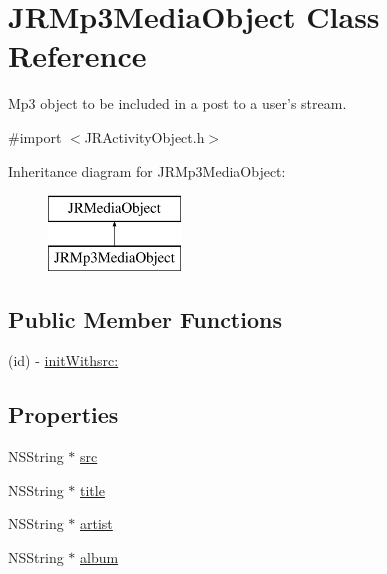 \hypertarget{interface_j_r_mp3_media_object}{
\section{JRMp3MediaObject Class Reference}
\label{interface_j_r_mp3_media_object}
}


Mp3 object to be included in a post to a user's stream.  




{\ttfamily \#import $<$JRActivityObject.h$>$}

Inheritance diagram for JRMp3MediaObject:\begin{figure}[H]
\begin{center}
\leavevmode
\includegraphics[height=2.000000cm]{interface_j_r_mp3_media_object}
\end{center}
\end{figure}
\subsection*{Public Member Functions}
\begin{DoxyCompactItemize}
\item 
(id) -\/ \hyperlink{interface_j_r_mp3_media_object_acd2154d8f3a288a9fe45dd11642ac733}{initWithsrc:}
\end{DoxyCompactItemize}
\subsection*{Properties}
\begin{DoxyCompactItemize}
\item 
NSString $\ast$ \hyperlink{interface_j_r_mp3_media_object_ae6ae676c1841834aba74a2c5d11cb54c}{src}
\item 
NSString $\ast$ \hyperlink{interface_j_r_mp3_media_object_accd252e22f704fd4b314217317f0b5cb}{title}
\item 
NSString $\ast$ \hyperlink{interface_j_r_mp3_media_object_aa164b3ecc14b03d36f5093d3d4d7f5b1}{artist}
\item 
NSString $\ast$ \hyperlink{interface_j_r_mp3_media_object_adefc6578183aa09a492b229696f581df}{album}
\end{DoxyCompactItemize}


